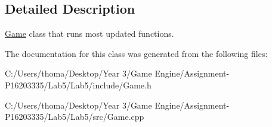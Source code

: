 \subsection{Detailed Description}
\mbox{\hyperlink{class_game}{Game}} class that runs most updated functions. 

The documentation for this class was generated from the following files\+:\begin{DoxyCompactItemize}
\item 
C\+:/\+Users/thoma/\+Desktop/\+Year 3/\+Game Engine/\+Assignment-\/\+P16203335/\+Lab5/\+Lab5/include/Game.\+h\item 
C\+:/\+Users/thoma/\+Desktop/\+Year 3/\+Game Engine/\+Assignment-\/\+P16203335/\+Lab5/\+Lab5/src/Game.\+cpp\end{DoxyCompactItemize}
